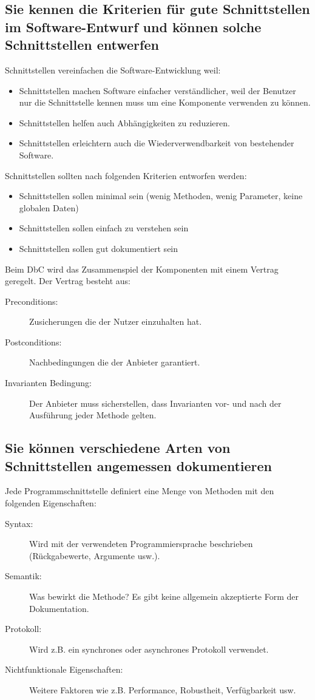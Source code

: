
\newpage

\subsection{Sie kennen die Kriterien für gute Schnittstellen im Software-Entwurf und können solche Schnittstellen entwerfen}

Schnittstellen vereinfachen die Software-Entwicklung weil:
\begin{itemize}
	\item Schnittstellen machen Software einfacher verständlicher, weil der Benutzer nur die Schnittstelle kennen muss um eine Komponente verwenden zu können.
	\item Schnittstellen helfen auch Abhängigkeiten zu reduzieren.
	\item Schnittstellen erleichtern auch die Wiederverwendbarkeit von bestehender Software.
\end{itemize}
Schnittstellen sollten nach folgenden Kriterien entworfen werden:
\begin{itemize}
	\item Schnittstellen sollen minimal sein (wenig Methoden, wenig Parameter, keine globalen Daten)
	\item Schnittstellen sollen einfach zu verstehen sein
	\item Schnittstellen sollen gut dokumentiert sein
\end{itemize}
Beim \ac{DbC} wird das Zusammenspiel der Komponenten mit einem Vertrag geregelt. Der Vertrag besteht aus:
\begin{description}
	\item[Preconditions:] Zusicherungen die der Nutzer einzuhalten hat.
	\item[Postconditions:] Nachbedingungen die der Anbieter garantiert.
	\item[Invarianten Bedingung:] Der Anbieter muss sicherstellen, dass Invarianten vor- und nach der Ausführung jeder Methode gelten.
\end{description}

\subsection{Sie können verschiedene Arten von Schnittstellen angemessen dokumentieren}

Jede Programmschnittstelle definiert eine Menge von Methoden mit den folgenden Eigenschaften:
\begin{description}
	\item[Syntax:] Wird mit der verwendeten Programmiersprache beschrieben (Rückgabewerte, Argumente usw.).
	\item[Semantik:] Was bewirkt die Methode? Es gibt keine allgemein akzeptierte Form der Dokumentation.
	\item[Protokoll:] Wird z.B. ein synchrones oder asynchrones Protokoll verwendet.
	\item[Nichtfunktionale Eigenschaften:] Weitere Faktoren wie z.B. Performance, Robustheit, Verfügbarkeit usw.
\end{description}

